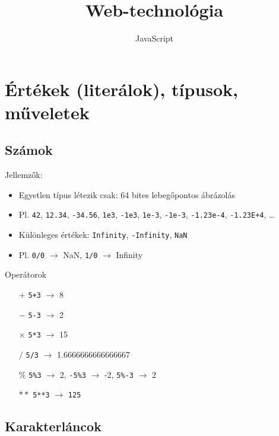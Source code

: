 \documentclass[usenames,dvipsnames,aspectratio=169]{beamer}
\title[Web technológiák - JavaScript]{Web-technológia}
\subtitle{JavaScript}
\begin{document}
\begin{frame}[plain]
  \titlepage
  \logoalul
\end{frame}

\section{Értékek (literálok), típusok, műveletek}

\subsection{Számok}

\begin{frame}
    Jellemzők:
    \begin{itemize}
        \item Egyetlen típus létezik csak: 64 bites lebegőpontos ábrázolás
        \item Pl. \texttt{42}, \texttt{12.34}, \texttt{-34.56}, \texttt{1e3}, \texttt{-1e3}, \texttt{1e-3}, \texttt{-1e-3}, \texttt{-1.23e-4}, \texttt{-1.23E+4}, \dots
        \item Különleges értékek: \texttt{Infinity}, \texttt{-Infinity}, \texttt{NaN}
        \item Pl. \texttt{0/0} $\to$ NaN, \texttt{1/0} $\to$ Infinity
    \end{itemize}
    \vfill
    Operátorok
    \begin{itemize}
        \item[$+$] \texttt{5+3} $\to$ 8
        \item[$-$] \texttt{5-3} $\to$ 2 
        \item[$\times$] \texttt{5*3} $\to$ 15
        \item[$/$] \texttt{5/3} $\to$ 1.6666666666666667
        \item[$\%$] \texttt{5\%3} $\to$ 2, \texttt{-5\%3} $\to$ -2, \texttt{5\%-3} $\to$ 2 
        \item[$**$] \texttt{5**3} $\to$ \texttt{125} 
    \end{itemize}
\end{frame}

\subsection{Karakterláncok}
\end{document}
